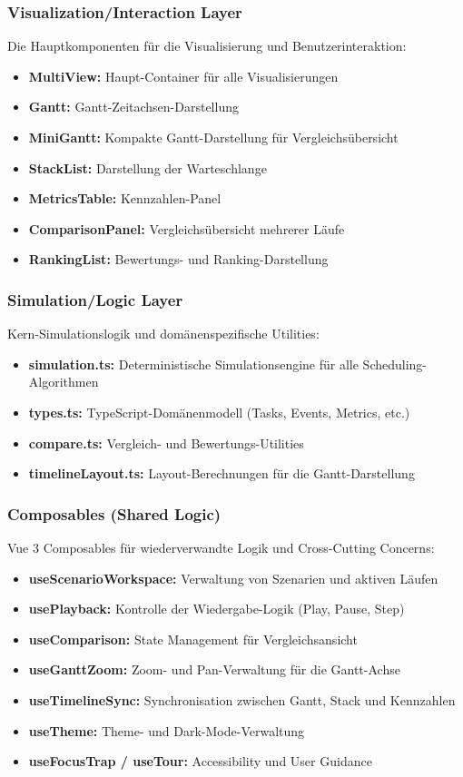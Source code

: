 \subsubsection*{Visualization/Interaction Layer}
Die Hauptkomponenten für die Visualisierung und Benutzerinteraktion:
\begin{itemize}
    \item \textbf{MultiView:} Haupt-Container für alle Visualisierungen
    \item \textbf{Gantt:} Gantt-Zeitachsen-Darstellung
    \item \textbf{MiniGantt:} Kompakte Gantt-Darstellung für Vergleichsübersicht
    \item \textbf{StackList:} Darstellung der Warteschlange
    \item \textbf{MetricsTable:} Kennzahlen-Panel
    \item \textbf{ComparisonPanel:} Vergleichsübersicht mehrerer Läufe
    \item \textbf{RankingList:} Bewertungs- und Ranking-Darstellung
\end{itemize}

\subsubsection*{Simulation/Logic Layer}
Kern-Simulationslogik und domänenspezifische Utilities:
\begin{itemize}
    \item \textbf{simulation.ts:} Deterministische Simulationsengine für alle Scheduling-Algorithmen
    \item \textbf{types.ts:} TypeScript-Domänenmodell (Tasks, Events, Metrics, etc.)
    \item \textbf{compare.ts:} Vergleich- und Bewertungs-Utilities
    \item \textbf{timelineLayout.ts:} Layout-Berechnungen für die Gantt-Darstellung
\end{itemize}

\subsubsection*{Composables (Shared Logic)}
Vue 3 Composables für wiederverwandte Logik und Cross-Cutting Concerns:
\begin{itemize}
    \item \textbf{useScenarioWorkspace:} Verwaltung von Szenarien und aktiven Läufen
    \item \textbf{usePlayback:} Kontrolle der Wiedergabe-Logik (Play, Pause, Step)
    \item \textbf{useComparison:} State Management für Vergleichsansicht
    \item \textbf{useGanttZoom:} Zoom- und Pan-Verwaltung für die Gantt-Achse
    \item \textbf{useTimelineSync:} Synchronisation zwischen Gantt, Stack und Kennzahlen
    \item \textbf{useTheme:} Theme- und Dark-Mode-Verwaltung
    \item \textbf{useFocusTrap / useTour:} Accessibility und User Guidance
\end{itemize}

